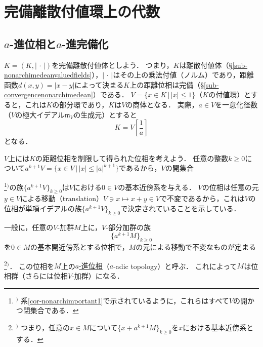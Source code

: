 \documentclass[a4paper,12pt, dvipdfmx]{jsbook}
\def\m{\mathfrak{m}}
\newcommand{\abs}[1]{\lvert#1\rvert}
\theoremstyle{plain}
\theoremstyle{definition}
\newcounter{chushaku}
\def\chu#1{\addtocounter{chushaku}{1}\footnote[\value{chushaku}]{${}^)$ #1}${}^)$}
\begin{document}
\setcounter{chushaku}{0}
\chapter{完備離散付値環上の代数}\label{CH-ADICTOPOLOGY}
\section{$a$-進位相と$a$-進完備化}\label{sec-aadictopologycompletion}
$K=(K,\abs{\,\cdot\,})$を完備離散付値体としよう．
つまり，$K$は離散付値体（\S\ref{sub-nonarchimedeanvaluedfields}），$\abs{\,\cdot\,}$はその上の乗法付値（ノルム）であり，距離函数$d(x,y)=\abs{x-y}$によって決まる$K$上の距離位相は完備（\S\ref{sub-convergencenonarchimedean}）である．
$V=\{x\in K\,|\,\abs{x}\leq 1\}$（$K$の付値環）とすると，これは$K$の部分環であり，$K$は$V$の商体となる．
実際，$a\in V$を一意化径数（$V$の極大イデアル$\m_V$の生成元）とすると
$$
K=V[{\textstyle \frac{1}{a}}]
$$
となる．

$V$上には$K$の距離位相を制限して得られた位相を考えよう．
任意の整数$k\geq 0$について$a^{k+1}V=\{x\in V\,|\,\abs{x}\leq\abs{a}^{k+1}\}$であるから，$V$の開集合\chu{系\ref{cor-nonarchimportant1}で示されているように，これらはすべて$V$の開かつ閉集合である．}の族$\{a^{k+1}V\}_{k\geq 0}$は$V$における$0\in V$の基本近傍系を与える．
$V$の位相は任意の元$y\in V$による移動（translation）$V\ni x\mapsto x+y\in V$で不変であるから，これは$V$の位相が単項イデアルの族$\{a^{k+1}V\}_{k\geq 0}$で決定されていることを示している．

一般に，任意の$V$-加群$M$上に，$V$-部分加群の族
$$
\{a^{k+1}M\}_{k\geq 0}
$$
を$0\in M$の基本開近傍系とする位相で，$M$の元による移動で不変なものが定まる\chu{つまり，任意の$x\in M$について$\{x+a^{k+1}M\}_{k\geq 0}$を$x$における基本近傍系とする．}．
この位相を$M$上の\underline{$a$-進位相}（$a$-adic topology）と呼ぶ．
これによって$M$は位相群（さらには位相$V$-加群）になる．
\end{document}
